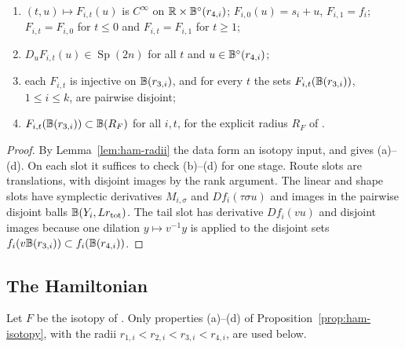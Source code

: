 \begin{proposition}\label{prop:ham-isotopy}
\begin{enumerate}[label=(\alph*)]
\item $(t,u)\mapsto F_{i,t}(u)$ is $C^\infty$ on $\mathbb{R}\times\mathbb{B}^\circ(r_{4,i})$; $F_{i,0}(u)=s_i+u$, $F_{i,1}=f_i$;
 $F_{i,t}=F_{i,0}$ for $t\le0$ and $F_{i,t}=F_{i,1}$ for $t\ge1$;
\item $D_uF_{i,t}(u)\in\operatorname{Sp}(2n)$ for all $t$ and $u\in\mathbb{B}^\circ(r_{4,i})$;
\item each $F_{i,t}$ is injective on $\mathbb{B}(r_{3,i})$, and for every $t$ the sets $F_{i,t}(\mathbb{B}(r_{3,i}))$, $1\le i\le k$, are
 pairwise disjoint;
\item $F_{i,t}(\mathbb{B}(r_{3,i}))\subset\mathbb{B}(R_F)$ for all $i,t$, for the explicit radius $R_F$ of .
\end{enumerate}
\end{proposition}

\begin{proof}
By Lemma~\ref{lem:ham-radii} the data form an isotopy input, and  gives (a)--(d).
On each slot it suffices to check (b)--(d) for one stage. Route slots are translations, with disjoint images by the rank
argument. The linear and shape slots have symplectic derivatives $M_{i,\sigma}$ and $Df_i(\tau\sigma u)$ and images in the
pairwise disjoint balls $\mathbb{B}(Y_i,Lr_{\rm tot})$. The tail slot has derivative $Df_i(vu)$ and disjoint images because one
dilation $y\mapsto v^{-1}y$ is applied to the disjoint sets $f_i(v\mathbb{B}(r_{3,i}))\subset f_i(\mathbb{B}(r_{4,i}))$.
\end{proof}

\subsection{The Hamiltonian}\label{sec:ham-hamiltonian}

Let $F$ be the isotopy of . Only properties (a)--(d) of
Proposition~\ref{prop:ham-isotopy}, with the radii $r_{1,i}<r_{2,i}<r_{3,i}<r_{4,i}$, are used below.

